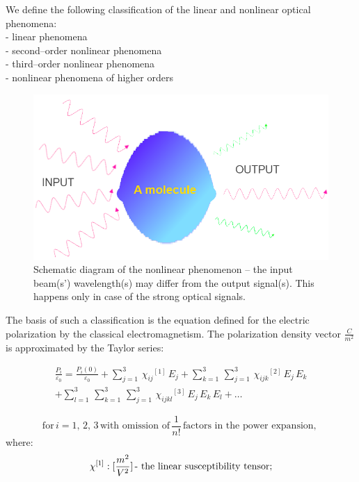 \documentclass[12pt,twoside,a4paper]{article}
\numberwithin{equation}{subsection}
\numberwithin{figure}{subsection}
\begin{document}
We define the following classification of the linear and nonlinear optical phenomena: \\
- linear phenomena \\
- second--order nonlinear phenomena \\ 
- third--order nonlinear phenomena \\
- nonlinear phenomena of higher orders
\begin{figure} 
  \includegraphics[width=150mm]{img/opt_phenom3.png}
  \caption{Schematic diagram of the nonlinear phenomenon -- the input beam(s') wavelength(s) may differ from the output signal(s).
  This happens only in case of the strong optical signals.
  \label{fig:nonlinear_phenomenom}}
\end{figure}

The basis of such a classification is the equation defined for the electric polarization by the classical electromagnetism. The
polarization density vector $\frac{C}{m^2}$ is approximated by the Taylor series: 

\begin{equation} \label{eq:polarization_taylor}
  \begin{split}
    \frac {{P_{i}}}{{\varepsilon_{0}}}=\frac {{P_{i}}(0)}{{\varepsilon_{0}}}
    + \sum_{j=1}^{3}\,{\chi_{ij}}^{[1]}\,{E_{j}}
    + \sum_{k=1}^{3}\,\sum_{j=1}^{3}\,{\chi_{{ijk}}}^{[2]}\,{E_{j}}\,{E_{k}}  \\
    + \sum_{l=1}^{3}\,\sum_{k=1}^{3}\, \sum_{j=1}^{3}\,{\chi_{ijkl}}^{[3]}\,{E_{j}}\,{E_{k}}\,{E_{l}}
    + \ldots
  \end{split}
\end{equation}

\begin{equation*}
  \mbox{for}\,i=1, \,2, \,3\,\mbox{with omission of}\,\frac {1}{n\mathrm{!}}\, \mbox{factors in the power expansion, }
\end{equation*}
where: 
\begin{equation*}
  \chi ^{[1]} : [\frac {m^{2}}{V^{2}}]
  \mbox{\,- the linear susceptibility tensor;}
\end{equation*}
\end{document}
